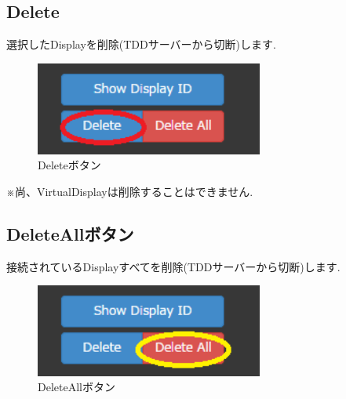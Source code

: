 \documentclass[a4paper,10pt,oneside]{jsbook}
\begin{document}
\subsection{Delete}
選択したDisplayを削除(TDDサーバーから切断)します.\\
\begin{figure}[htbp]
	\begin{center}
		\includegraphics[width=7.5cm]{image/3Button2.PNG}
	\end{center}
	\caption{Deleteボタン}
	\label{fig:deletebutton}
\end{figure}

※尚、VirtualDisplayは削除することはできません.\\



\subsection{DeleteAllボタン}
接続されているDisplayすべてを削除(TDDサーバーから切断)します.\\

\begin{figure}[htbp]
	\begin{center}
		\includegraphics[width=7.5cm]{image/3Button3.PNG}
	\end{center}
	\caption{DeleteAllボタン}
	\label{fig:deleteallbutton}
\end{figure}

\newpage


\end{document}

